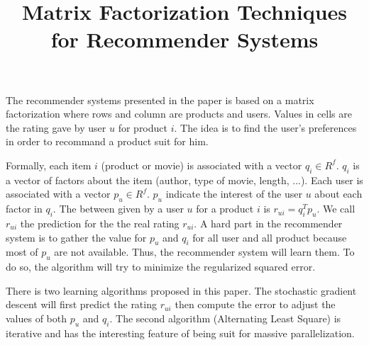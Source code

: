 \documentclass{article}
\title{Matrix Factorization Techniques for Recommender Systems}
\begin{document}
\maketitle
The recommender systems presented in the paper is
based on a matrix factorization where rows and
column are products and users. Values in cells are
the rating gave by user $u$ for product $i$.
The idea is to find the user's preferences in
order to recommand a product suit for him.

Formally, each item $i$ (product or movie) is
associated with a vector $q_{i} \in R^{f}$.
$q_{i}$ is a vector of factors about the item
(author, type of movie, length, ...).
Each user is associated with a vector $p_{u} \in
R^{f}$. $p_{u}$ indicate the interest of the user
$u$ about each factor in $q_{i}$.
The between given by a user $u$ for a product $i$
is $r_{ui} = q_{i}^{T} p_{u}$. We call $r_{ui}$
the prediction for the the real rating $r_{ui}$.
A hard part in the recommender system is to gather
the value for $p_{u}$ and $q_{i}$ for all user and
all product because most of $p_{u}$ are not
available. Thus, the recommender system will learn
them. To do so, the algorithm will try to minimize
the regularized squared error.

There is two learning algorithms proposed in this
paper. The stochastic gradient descent will first
predict the rating $r_{ui}$ then compute the
error to adjust the values of both $p_{u}$ and $q_{i}$.
The second algorithm (Alternating Least Square) is
iterative and has the interesting feature of
being suit for massive parallelization.
\end{document}
